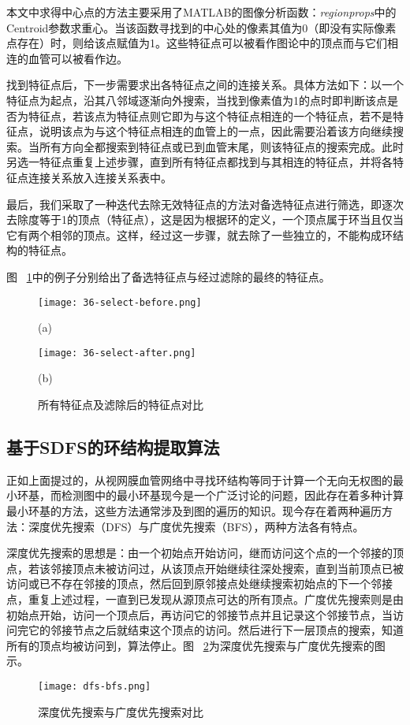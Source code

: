 本文中求得中心点的方法主要采用了MATLAB的图像分析函数：\emph{regionprops}中的Centroid参数求重心。当该函数寻找到的中心处的像素其值为0（即没有实际像素点存在）时，则给该点赋值为1。这些特征点可以被看作图论中的顶点而与它们相连的血管可以被看作边。

找到特征点后，下一步需要求出各特征点之间的连接关系。具体方法如下：以一个特征点为起点，沿其八邻域逐渐向外搜索，当找到像素值为1的点时即判断该点是否为特征点，若该点为特征点则它即为与这个特征点相连的一个特征点，若不是特征点，说明该点为与这个特征点相连的血管上的一点，因此需要沿着该方向继续搜索。当所有方向全都搜索到特征点或已到血管末尾，则该特征点的搜索完成。此时另选一特征点重复上述步骤，直到所有特征点都找到与其相连的特征点，并将各特征点连接关系放入连接关系表中。

最后，我们采取了一种迭代去除无效特征点的方法对备选特征点进行筛选，即逐次去除度等于1的顶点（特征点），这是因为根据环的定义，一个顶点属于环当且仅当它有两个相邻的顶点。这样，经过这一步骤，就去除了一些独立的，不能构成环结构的特征点。

图 ~\ref{select}中的例子分别给出了备选特征点与经过滤除的最终的特征点。
 \begin{figure}[ht]
\centering
  \begin{minipage}[b]{0.48\linewidth} 
      \centering 
      \texttt{[image: 36-select-before.png]}
        \centerline{(a)}\medskip
    \end{minipage}
  \begin{minipage}[b]{0.48\linewidth}
    \centering
    \texttt{[image: 36-select-after.png]}
      \centerline{(b) }\medskip
  \end{minipage}
\caption{所有特征点及滤除后的特征点对比}
    \label{select}
\end{figure}


\subsection{基于SDFS的环结构提取算法}
正如上面提过的，从视网膜血管网络中寻找环结构等同于计算一个无向无权图的最小环基，而检测图中的最小环基现今是一个广泛讨论的问题，因此存在着多种计算最小环基的方法，这些方法通常涉及到图的遍历的知识。现今存在着两种遍历方法：深度优先搜索（DFS）与广度优先搜索（BFS），两种方法各有特点。

深度优先搜索的思想是：由一个初始点开始访问，继而访问这个点的一个邻接的顶点，若该邻接顶点未被访问过，从该顶点开始继续往深处搜索，直到当前顶点已被访问或已不存在邻接的顶点，然后回到原邻接点处继续搜索初始点的下一个邻接点，重复上述过程，一直到已发现从源顶点可达的所有顶点。广度优先搜索则是由初始点开始，访问一个顶点后，再访问它的邻接节点并且记录这个邻接节点，当访问完它的邻接节点之后就结束这个顶点的访问。然后进行下一层顶点的搜索，知道所有的顶点均被访问到，算法停止。图 ~\ref{dfs-bfs}为深度优先搜索与广度优先搜索的图示。
   \begin{figure}[ht!]
   \centering
  \texttt{[image: dfs-bfs.png]}
  \caption{深度优先搜索与广度优先搜索对比}
    \label{dfs-bfs}
 \end{figure}
 
